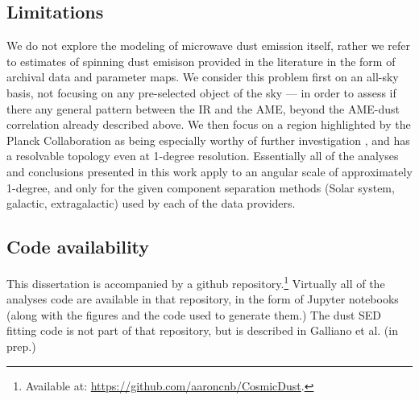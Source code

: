   \subsection{Limitations}
    We do not explore the modeling of microwave dust emission itself, rather we refer to estimates of spinning dust emisison provided in the literature \citep{planckXII, wmap03b} in the form of archival data and parameter maps. We consider this problem first on an all-sky basis, not focusing on any pre-selected object of the sky --- in order to assess if there any general pattern between the IR and the AME, beyond the AME-dust correlation already described above. We then focus on a region highlighted by the Planck Collaboration as being especially worthy of further investigation \citep{planck15X}, and has a resolvable topology even at 1-degree resolution. Essentially all of the analyses and conclusions presented in this work apply to an angular scale of approximately 1-degree, and only for the given component separation methods (Solar system, galactic, extragalactic) used by each of the data providers.

  \subsection{Code availability}
    This dissertation is accompanied by a github repository.\footnote{Available at: \url{https://github.com/aaroncnb/CosmicDust}.} Virtually all of the analyses code are available in that repository, in the form of Jupyter notebooks (along with the figures and the code used to generate them.) The dust SED fitting code is not part of that repository, but is described in Galliano et al. (in prep.)
